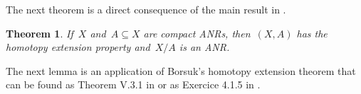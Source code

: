 \documentclass[english,11pt]{article}
\theoremstyle{plain}
\newtheorem{theorem}{Theorem}[section]
\theoremstyle{remark}
\theoremstyle{definition}
\newcommand{\id}{\mathrm{id}}
\newcommand{\C}[1]{\mathsf{C}(#1)}%
\begin{document}
The next theorem is a direct consequence of the main result in \cite{Whitehead48}.
\begin{theorem}\label{prop_quotient_anr}
If~$X$ and~$A\subseteq X$ are compact ANRs, then~$(X,A)$ has the homotopy extension property and~$X/A$ is an ANR.
\end{theorem}
%
%
%
%
%
%

The next lemma is an application of Borsuk's homotopy extension theorem that can be found as Theorem V.3.1 in \cite{Borsuk67} or as Exercice 4.1.5 in \cite{Mill01}.
\end{document}
